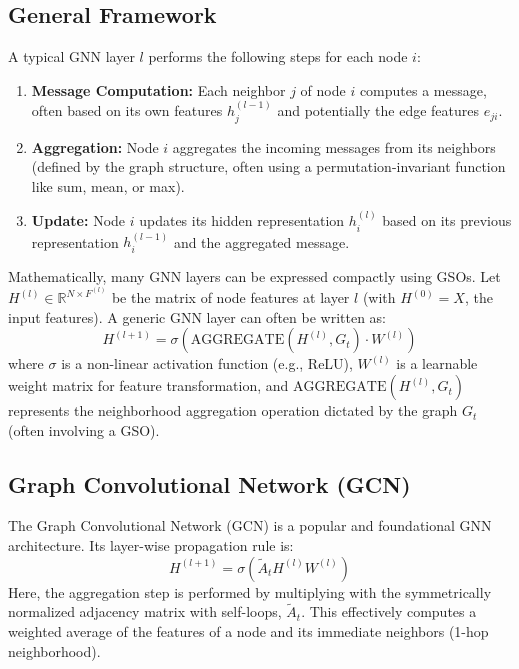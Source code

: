 \subsection{General Framework}
A typical GNN layer $l$ performs the following steps for each node $i$:
\begin{enumerate}
    \item \textbf{Message Computation:} Each neighbor $j$ of node $i$ computes a message, often based on its own features $h_j^{(l-1)}$ and potentially the edge features $e_{ji}$.
    \item \textbf{Aggregation:} Node $i$ aggregates the incoming messages from its neighbors (defined by the graph structure, often using a permutation-invariant function like sum, mean, or max).
    \item \textbf{Update:} Node $i$ updates its hidden representation $h_i^{(l)}$ based on its previous representation $h_i^{(l-1)}$ and the aggregated message.
\end{enumerate}
Mathematically, many GNN layers can be expressed compactly using GSOs. Let $H^{(l)} \in \mathbb{R}^{N \times F^{(l)}}$ be the matrix of node features at layer $l$ (with $H^{(0)} = X$, the input features). A generic GNN layer can often be written as:
\begin{equation}
    H^{(l+1)} = \sigma \left( \text{AGGREGATE} \left( H^{(l)}, G_t \right) \cdot W^{(l)} \right)
\end{equation}
where $\sigma$ is a non-linear activation function (e.g., ReLU), $W^{(l)}$ is a learnable weight matrix for feature transformation, and $\text{AGGREGATE}(H^{(l)}, G_t)$ represents the neighborhood aggregation operation dictated by the graph $G_t$ (often involving a GSO).

\subsection{Graph Convolutional Network (GCN)}
The Graph Convolutional Network (GCN) \cite{Kipf2017GCN} is a popular and foundational GNN architecture. Its layer-wise propagation rule is:
\begin{equation}
    H^{(l+1)} = \sigma \left( \tilde{A}_t H^{(l)} W^{(l)} \right)
    \label{eq:gcn_layer}
\end{equation}
Here, the aggregation step is performed by multiplying with the symmetrically normalized adjacency matrix with self-loops, $\tilde{A}_t$. This effectively computes a weighted average of the features of a node and its immediate neighbors (1-hop neighborhood).

